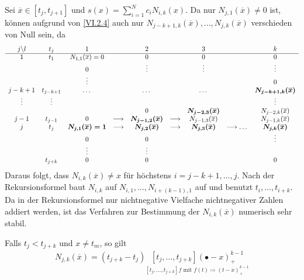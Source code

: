\label{6.2.8}
Sei $\overline{x}\in[t_j,t_{j+1}]$ und
$s(x) = \sum_{i=1}^{N}c_iN_{i,k}(x)$.
Da nur $N_{j,1}(\overline{x})\neq 0$ ist, 
können aufgrund von \eqref{VI.2.4}
auch nur $N_{j-k+1, k}(\overline{x}), \dotsc, N_{j,k}(\overline{x})$
verschieden von Null sein, da
\begin{align*}
  \begin{array}{ccccccccc}
    j\backslash l 
    & t_j& 1 && 2 && 3 &&k\\
    \cline{1-9}
    1 & t_1 & N_{1,1}(\overline{x})=0 &&0&&0&&0\\
    &&0&&\vdots&&\vdots&&\vdots\\
    &&\vdots &&&&&&0\\
    j-k+1&t_{j-k+1}
         &\dots &&\dots&&\dots
                       &&\boldsymbol{N_{j-k+1,k}(\overline{x})} \\
    \vdots&\vdots&&&&&&&\vdots\\
    && &&0&& \boldsymbol{N_{j-2,3}(\overline{x})}
                  &&N_{j-2,k}(\overline{x})\\
    j-1 & t_{j-1} &0 
             &\longrightarrow & \boldsymbol{N_{j-1,2}(\overline{x})}
                       &\longrightarrow & N_{j-1,3}(\overline{x})
            && N_{j-1,k}(\overline{x})\\
    j& t_j 
         & \boldsymbol{N_{j,1}(\overline{x})=1}
             &\longrightarrow&\boldsymbol{N_{j,2}(\overline{x})}
                       &\longrightarrow&\boldsymbol{N_{j,3}(\overline{x})}
            &\longrightarrow\dots&\boldsymbol{N_{j,k}(\overline{x})}\\
    &&0&&0&&&&\vdots\\
    &&\vdots &&\vdots\\
    &t_{j+k}&0&&0&&&&0
  \end{array}
\end{align*}
Daraus folgt, dass $N_{i,k}(\overline{x})\neq x$ 
für höchstens $i=j-k+1,\dotsc, j$.
Nach der Rekursionsformel baut $N_{i,k}$ auf 
$N_{i,1},\dotsc , N_{i+(k-1),1}$ auf und
benutzt $t_i,\dotsc, t_{i+k}$.
Da in der Rekursionsformel nur nichtnegative Vielfache
nichtnegativer Zahlen addiert werden,
ist das Verfahren zur Bestimmung der $N_{i,k}(\overline{x})$
numerisch sehr stabil.

\begin{Leme}
  Falls $t_j<t_{j+k}$ und $x\neq t_m$,
  so gilt
  \begin{gather}
    N_{j,k}(\overline{x})=(t_{j+k}-t_j)\underset{
      [t_j,\dotsc, t_{j+k}]f\text{ mit } f(t)\coloneqq (t-x)_+^{k-1}}
    {[t_j,\dotsc,t_{j+k}](\bullet -x)_+^{k-1}}
    \label{VI.2.5}
  \end{gather}
\end{Leme}


